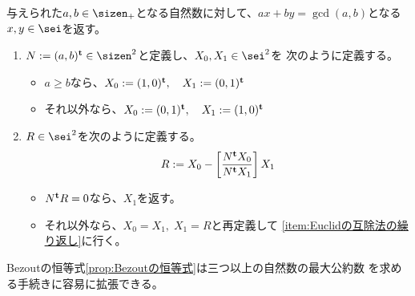 {	\begin{procedure}[Euclidの互除法]\label{proc:Euclidの互除法} %
		与えられた$a,b\in\sizen_+$となる自然数に対して、$ax+by=\gcd(a,b)$となる
		$x,y\in\sei$を返す。
		\begin{enumerate}\setlength{\itemsep}{-1mm} %
			\item\label{item:Euclidの互除法の初期化}
			$N:= (a,b)^\tran\in\sizen^2$と定義し、$X_0,X_1\in\sei^2$を
			次のように定義する。
			\begin{itemize}\setlength{\itemsep}{-1mm} %
				\item $a\ge b$なら、$X_0 := (1,0)^{\mathbf{t}},\quad X_1 := (0,1)^{\mathbf{t}}$
				\item それ以外なら、$X_0 := (0,1)^{\mathbf{t}},\quad X_1 := (1,0)^{\mathbf{t}}$
			\end{itemize} %
			\item\label{item:Euclidの互除法の繰り返し} 
			$R\in\sei^2$を次のように定義する。
			\begin{equation*}\begin{split}
				R := X_0 - \left[\frac{N^{\mathbf{t}} X_0}{N^{\mathbf{t}} X_1}\right] X_1
			\end{split}\end{equation*}
			\begin{itemize}\setlength{\itemsep}{-1mm} %
				\item $N^{\mathbf{t}} R=0$なら、$X_1$を返す。
				\item それ以外なら、$X_0=X_1,\;X_1=R$と再定義して
				\ref{item:Euclidの互除法の繰り返し}に行く。
			\end{itemize} %
		\end{enumerate} %
	\end{procedure} %

	Bezoutの恒等式\ref{prop:Bezoutの恒等式}は三つ以上の自然数の最大公約数
	を求める手続きに容易に拡張できる。

}
